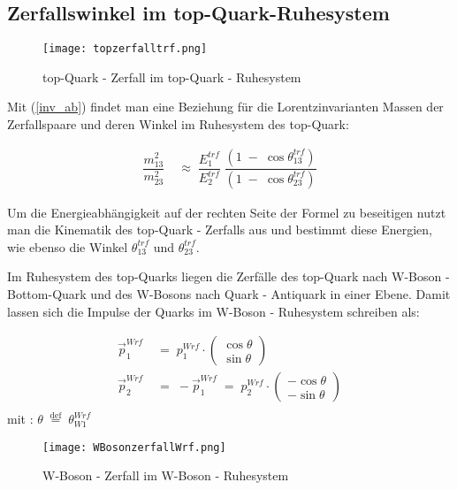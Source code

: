 \documentclass[
a4paper,                                %
twoside,                                %
BCOR1.4cm,                      %
ngerman,                                %
10pt,                           %
headings=normal,                %
headsepline,                    %
clearplainpage, %
final,                                  %
div=14,
parskip=full
]{scrbook}
\begin{document}
\newpage

\subsection{Zerfallswinkel im top-Quark-Ruhesystem}

\begin{figure}[h]
	\texttt{[image: topzerfalltrf.png]}
	\caption{top-Quark - Zerfall im top-Quark - Ruhesystem}
\end{figure}

Mit (\ref{inv_ab}) findet man eine Beziehung f\"ur die Lorentzinvarianten Massen der Zerfallspaare und deren Winkel im Ruhesystem des top-Quark:

\begin{align}
	\dfrac{m_{1 3}^{2}}{m_{2 3}^{2}}
\;&\approx\;
	\dfrac{E_{1}^{trf}}{E_{2}^{trf}}\;
	\dfrac{\left(1\;-\;\cos\theta_{13}^{trf}\right)}
	{\left(1\;-\;\cos\theta_{23}^{trf}\right)}
\label{m13m23anfang}
\end{align}

Um die Energieabh\"angigkeit auf der rechten Seite der Formel zu beseitigen nutzt man die Kinematik des top-Quark - Zerfalls aus und bestimmt diese Energien, wie ebenso die Winkel $ \theta_{13}^{trf} $ und $ \theta_{23}^{trf} $.

Im Ruhesystem des top-Quarks liegen die Zerf\"alle des top-Quark nach W-Boson - Bottom-Quark und des W-Bosons nach Quark - Antiquark in einer Ebene. Damit lassen sich die Impulse der Quarks im W-Boson - Ruhesystem schreiben als:

\begin{align}
	\vec{p}_{1}^{Wrf}
\;&=\;
	p_{1}^{Wrf}\cdot
	\begin{pmatrix}
		\cos \theta \\ \sin \theta
	\end{pmatrix}
\nonumber
\\
	\vec{p}_{2}^{Wrf}
\;&=\;
	-\vec{p}_{1}^{Wrf}
\;=\;	
	p_{2}^{Wrf}\cdot
	\begin{pmatrix}
		-\cos \theta \\ -\sin \theta
	\end{pmatrix}
\nonumber
\\
\end{align}
mit : $ \theta\;\stackrel{\mathrm{def}}=\;\theta^{Wrf}_{W1} $

\begin{figure}[h]
	\texttt{[image: WBosonzerfallWrf.png]}
	\caption{W-Boson - Zerfall im W-Boson - Ruhesystem}
\end{figure}
\end{document}
